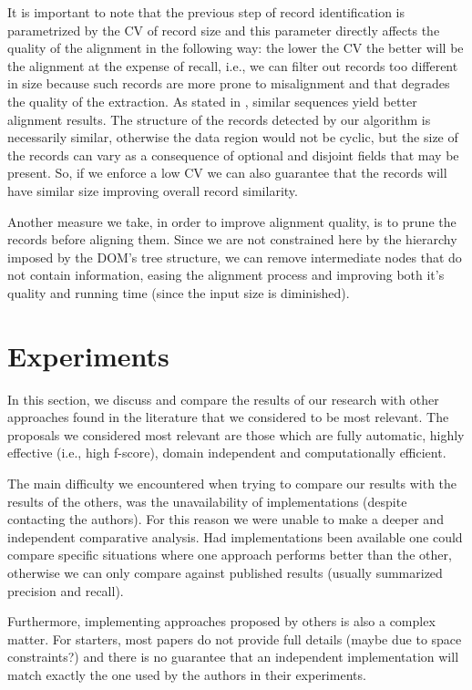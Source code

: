 \documentclass{vldb}
\begin{document}
It is important to note that the previous step of record identification
is parametrized by the CV of record size and this parameter directly affects the
quality of the alignment in the following way: the lower the CV the better will
be the alignment at the expense of recall, i.e., we can filter out records too
different in size because such records are more prone to misalignment and that
degrades the quality of the extraction. As stated in \cite{centerstar1993}, 
similar sequences yield better alignment results. The structure of the
records detected by our algorithm is necessarily similar, otherwise the
data region would not be cyclic, but the size of the records can vary as a
consequence of optional and disjoint fields that may be present.
So, if we enforce a low CV we can also guarantee that the records will have
similar size improving overall record similarity.

Another measure we take, in order to improve alignment quality, is to prune the
records before aligning them. Since we are not constrained here by the hierarchy
imposed by the DOM's tree structure, we can remove intermediate nodes that do
not contain information, easing the alignment process and improving both it's
quality and running time (since the input size is diminished).

\section{Experiments}\label{sec:result}

In this section, we discuss and compare the results of our research with other
approaches found in the literature that we considered to be most relevant. The
proposals we considered most relevant are those which are fully automatic,
highly effective (i.e., high f-score), domain independent and computationally
efficient.

The main difficulty we encountered when trying to compare our results with the
results of the others, was the unavailability of implementations (despite
contacting the authors). For this reason we were unable to make a deeper and
independent comparative analysis.
Had implementations been available one could compare specific situations where
one approach performs better than the other, otherwise we can only compare
against published results (usually summarized precision and recall).

Furthermore, implementing approaches proposed by others is also a complex
matter. For starters, most papers do not provide full details (maybe due to
space constraints?) and there is no guarantee that an independent implementation
will match exactly the one used by the authors in their experiments.
\end{document}
